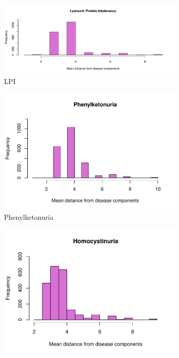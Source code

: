 \begin{figure}[h!]
    \centering
    \begin{subfigure}[b]{0.3\textwidth}
         \centering
          \includegraphics[scale=0.25]{Images/Lisinuric Protein Intolerance.pdf}
         \caption{LPI}
         \label{fig:Lisinuric}
     \end{subfigure}
     \hfill
     \begin{subfigure}[b]{0.3\textwidth}
         \centering
         \includegraphics[scale=0.25]{Images/Phenylketonuria.pdf}
         \caption{Phenylketonuria}
         \label{fig:Phenylketonuria}
     \end{subfigure}
     \hfill
     \begin{subfigure}[b]{0.3\textwidth}
         \centering
         \includegraphics[scale=0.25]{Images/Homocystinuria.pdf}

\end{subfigure}
\end{figure}
